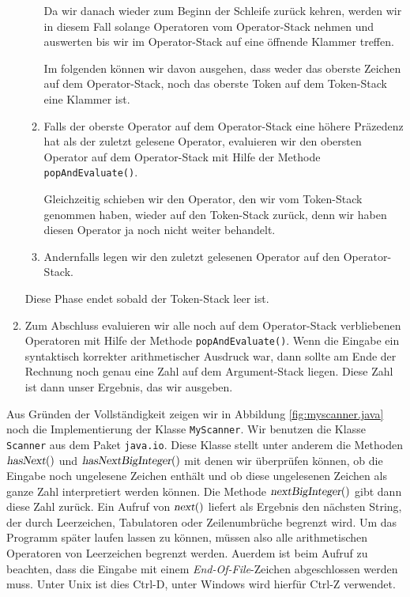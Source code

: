 \begin{enumerate}
\begin{enumerate}
            Da wir danach wieder zum Beginn der Schleife zur\"uck kehren, werden wir in
            diesem Fall solange Operatoren vom Operator-Stack nehmen und auswerten bis wir
            im Operator-Stack auf eine \"offnende Klammer treffen.

            Im folgenden k\"onnen wir davon ausgehen, dass weder das oberste Zeichen auf dem
            Operator-Stack, noch das oberste Token auf dem Token-Stack eine Klammer ist.
      \item Falls der oberste Operator auf dem Operator-Stack eine h\"ohere Pr\"azedenz hat
            als der zuletzt gelesene
            Operator,  evaluieren wir den obersten Operator auf dem
            Operator-Stack mit Hilfe der Methode \texttt{popAndEvaluate()}.

            Gleichzeitig schieben wir den Operator, den wir vom Token-Stack genommen
            haben, wieder auf den Token-Stack zur\"uck, denn wir haben diesen Operator ja
            noch nicht weiter behandelt.
      \item Andernfalls legen wir den zuletzt gelesenen Operator auf den Operator-Stack.
      \end{enumerate}
      Diese Phase endet sobald der Token-Stack leer ist.
\item Zum Abschluss evaluieren wir alle noch auf dem Operator-Stack verbliebenen Operatoren
      mit Hilfe der Methode \texttt{popAndEvaluate()}.
      Wenn die Eingabe ein syntaktisch korrekter arithmetischer Ausdruck war,
      dann sollte am Ende der Rechnung noch genau eine Zahl auf  dem Argument-Stack
      liegen.  Diese Zahl ist dann unser Ergebnis, das wir ausgeben.
\end{enumerate}
Aus Gr\"unden der Vollst\"andigkeit zeigen wir in Abbildung \ref{fig:myscanner.java}
noch die Implementierung der Klasse \texttt{MyScanner}.  Wir benutzen die Klasse
\texttt{Scanner} aus dem Paket \texttt{java.io}.  Diese Klasse stellt unter anderem die
Methoden $\textsl{hasNext}()$ und $\textsl{hasNextBigInteger}()$ mit denen wir \"uberpr\"ufen
k\"onnen, ob die Eingabe noch ungelesene Zeichen enth\"alt und ob diese ungelesenen Zeichen
als ganze Zahl interpretiert werden k\"onnen.  Die Methode $\textsl{nextBigInteger}()$ gibt
dann diese Zahl zur\"uck.  Ein Aufruf von $\textsl{next}()$ liefert als Ergebnis den
n\"achsten String, der durch Leerzeichen, Tabulatoren oder Zeilenumbr\"uche begrenzt wird.
Um das Programm sp\"ater laufen lassen zu k\"onnen, m\"ussen also alle arithmetischen Operatoren
von Leerzeichen begrenzt werden.  Au\3erdem ist beim Aufruf zu beachten, dass die Eingabe mit einem
\emph{End-Of-File}-Zeichen abgeschlossen werden muss.  Unter Unix ist dies Ctrl-D, unter
Windows wird hierf\"ur Ctrl-Z verwendet.

